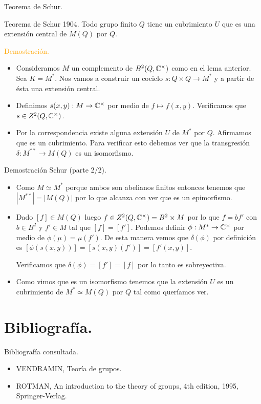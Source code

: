 \documentclass[aspectratio=169, 9pt]{beamer}
\begin{document}
\begin{frame}[fragile]{Teorema de Schur.}

\begin{alertblock}{Teorema de Schur 1904.}
Todo grupo finito $Q$ tiene un cubrimiento $U$ que es una extensión central de $M(Q)$ por $Q$.
\end{alertblock}

\pause
\textcolor{orange}{Demostración.} 
\begin{itemize}
	\item Consideramos $M$ un complemento de $B^2(Q, \Bbb C^\times)$ como en el lema anterior. Sea $K = M^*$. \pause Nos vamos a construir un cociclo $s:Q \times Q \to M^*$ y a partir de ésta una extensión central. \pause
	\item Definimos $s(x,y):M \to \Bbb C^\times$ por medio de $f\mapsto f(x,y).$ Verificamos que $s \in Z^2(Q, \Bbb C^\times)$. \pause
	\item Por la correspondencia existe alguna extensión $U$ de $M^*$ por $Q$. Afirmamos que es un cubrimiento. \pause Para verificar esto debemos ver que la transgresión $\delta: M^{**} \to  M(Q)$ es un isomorfismo. \pause
	
\end{itemize}

\end{frame}
\begin{frame}[fragile]{Demostración Schur (parte 2/2).}
\begin{itemize}
	\item Como $M \simeq M^{*}$ porque ambos son abelianos finitos entonces tenemos que $|M^{**}|=|M(Q)|$ por lo que alcanza con ver que es un epimorfismo.
	\pause
	\item Dado $[f] \in M(Q)$ luego $f \in Z^2(Q, \Bbb C^\times) = B^2 \times M$ por lo que $f=bf'$ con $b \in B^2$ y $f' \in M$ tal que $[f]=[f']$. \pause Podemos definir $\phi:M^{*} \to \Bbb C^\times$ por medio de $\phi(\mu) = \mu(f')$. \pause De esta manera vemos que $\delta(\phi)$ por definición es $[\phi(s(x,y))] = [s(x,y) (f')] = [f'(x,y)]$. \pause
	\medskip
	
	Verificamos que $\delta(\phi) = [f'] = [f]$ por lo tanto es sobreyectiva.
	
	\item Como vimos que es un isomorfismo tenemos que la extensión $U$ es un cubrimiento de $M^* \simeq M(Q)$ por $Q$ tal como queríamos ver.
\end{itemize}
\end{frame}
\section{Bibliografía.}
\begin{frame}[fragile]{Bibliografía consultada.}
\begin{itemize}
	\item VENDRAMIN, Teoría de grupos.
	\item ROTMAN, An introduction to the theory of groups, 4th edition, 1995, Springer-Verlag.
\end{itemize}
\end{frame}
\end{document}
